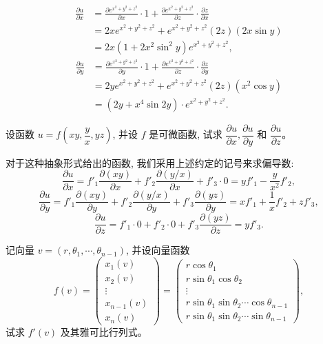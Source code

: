 \documentclass[UTF8,12pt,a4paper,fontset=fandol]{ctexart}
\begin{document}
\begin{solve}\quad
\[
\begin{aligned}
  \frac{\partial u}{\partial x}
  &=\frac{\partial e^{x^2+y^2+z^2}}{\partial x}\cdot1
  +\frac{\partial e^{x^2+y^2+z^2}}{\partial z}\cdot\frac{\partial z}{\partial x}\\
  &=2xe^{x^2+y^2+z^2}+e^{x^2+y^2+z^2}(2z)(2x\sin y)\\
  &=2x(1+2x^2\sin^2 y)e^{x^2+y^2+z^2},
\end{aligned}
\]
\[
\begin{aligned}
  \frac{\partial u}{\partial y}
  &=\frac{\partial e^{x^2+y^2+z^2}}{\partial y}\cdot1
  +\frac{\partial e^{x^2+y^2+z^2}}{\partial z}\cdot\frac{\partial z}{\partial y}\\
  &=2ye^{x^2+y^2+z^2}+e^{x^2+y^2+z^2}(2z)(x^2\cos y)\\
  &=(2y+x^4\sin2y)\cdot e^{x^2+y^2+z^2}.
\end{aligned}
\]

\end{solve}
\begin{example}\label{course-example-14-2-2}\quad 设函数 $u=f\left(xy,\dfrac yx,yz\right)$, 并设 $f$ 是可微函数, 试求 $\dfrac{\partial u}{\partial x}, \dfrac{\partial u}{\partial y}$ 和 $\dfrac{\partial u}{\partial z}$。

\end{example}
\begin{solve}\quad 对于这种抽象形式给出的函数, 我们采用上述约定的记号来求偏导数:
\[
  \frac{\partial u}{\partial x}
  =f'_1\frac{\partial(xy)}{\partial x}+f'_2\frac{\partial(y/x)}{\partial x}+f'_3\cdot0
  =yf'_1-\frac{y}{x^2}f'_2,
\]
\[
  \frac{\partial u}{\partial y}
  =f'_1\frac{\partial(xy)}{\partial y}
  +f'_2\frac{\partial(y/x)}{\partial y}
  +f'_3\frac{\partial(yz)}{\partial y}
  =xf'_1+\frac1x f'_2+zf'_3,
\]
\[
  \frac{\partial u}{\partial z}
  =f'_1\cdot0+f'_2\cdot0+f'_3\frac{\partial(yz)}{\partial z}
  =yf'_3.
\]

\end{solve}
\begin{example}\label{course-example-14-2-3}\quad 记向量 $v=(r,\theta_1,\cdots,\theta_{n-1})$, 并设向量函数
\[
  f(v)=
  \begin{pmatrix}
    x_1(v)\\
    x_2(v)\\
    \vdots\\
    x_{n-1}(v)\\
    x_n(v)
  \end{pmatrix}
  =
  \begin{pmatrix}
    r\cos\theta_1\\
    r\sin\theta_1\cos\theta_2\\
    \vdots\\
    r\sin\theta_1\sin\theta_2\cdots\cos\theta_{n-1}\\
    r\sin\theta_1\sin\theta_2\cdots\sin\theta_{n-1}
  \end{pmatrix},
\]
试求 $f'(v)$ 及其雅可比行列式。

\end{example}
\end{document}

